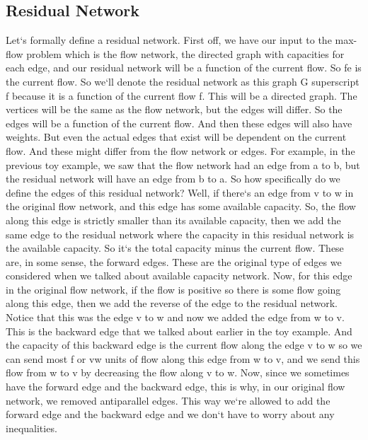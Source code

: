 \subsection{Residual Network}
Let`s formally define a residual network.
First off, we have our input to the max-flow problem which is the flow network, the directed graph with capacities for each edge, and our residual network will be a function of the current flow.
So fe is the current flow.
So we`ll denote the residual network as this graph G superscript f because it is a function of the current flow f.
This will be a directed graph.
The vertices will be the same as the flow network, but the edges will differ.
So the edges will be a function of the current flow.
And then these edges will also have weights.
But even the actual edges that exist will be dependent on the current flow.
And these might differ from the flow network or edges.
For example, in the previous toy example, we saw that the flow network had an edge from a to b, but the residual network will have an edge from b to a.
So how specifically do we define the edges of this residual network? Well, if there`s an edge from v to w in the original flow network, and this edge has some available capacity.
So, the flow along this edge is strictly smaller than its available capacity, then we add the same edge to the residual network where the capacity in this residual network is the available capacity.
So it`s the total capacity minus the current flow.
These are, in some sense, the forward edges.
These are the original type of edges we considered when we talked about available capacity network.
Now, for this edge in the original flow network, if the flow is positive so there is some flow going along this edge, then we add the reverse of the edge to the residual network.
Notice that this was the edge v to w and now we added the edge from w to v.
This is the backward edge that we talked about earlier in the toy example.
And the capacity of this backward edge is the current flow along the edge v to w so we can send most f or vw units of flow along this edge from w to v, and we send this flow from w to v by decreasing the flow along v to w.
Now, since we sometimes have the forward edge and the backward edge, this is why, in our original flow network, we removed antiparallel edges.
This way we`re allowed to add the forward edge and the backward edge and we don`t have to worry about any inequalities.

